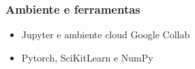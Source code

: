 \documentclass{beamer}
\begin{document}
\begin{frame}
    \frametitle{Ambiente e ferramentas}
    \begin{itemize}
        \item Jupyter e ambiente cloud Google Collab
        \item Pytorch, SciKitLearn e NumPy
    \end{itemize}




\end{frame}
\end{document}
